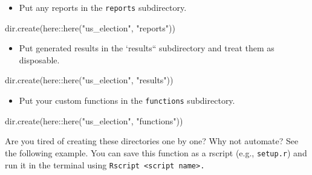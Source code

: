 \documentclass[
  letterpaper,
  DIV=11,
  numbers=noendperiod]{scrreprt}
\newenvironment{Shaded}{\begin{snugshade}}{\end{snugshade}}
\newcommand{\FunctionTok}[1]{\textcolor[rgb]{0.28,0.35,0.67}{#1}}
\newcommand{\NormalTok}[1]{\textcolor[rgb]{0.00,0.23,0.31}{#1}}
\newcommand{\SpecialCharTok}[1]{\textcolor[rgb]{0.37,0.37,0.37}{#1}}
\newcommand{\StringTok}[1]{\textcolor[rgb]{0.13,0.47,0.30}{#1}}
\providecommand{\tightlist}{%
  \setlength{\itemsep}{0pt}\setlength{\parskip}{0pt}}\usepackage{longtable,booktabs,array}
\begin{document}
\begin{itemize}
\tightlist
\item
  Put any reports in the \texttt{reports} subdirectory.
\end{itemize}

\begin{Shaded}
\begin{Highlighting}[]
\FunctionTok{dir.create}\NormalTok{(here}\SpecialCharTok{::}\FunctionTok{here}\NormalTok{(}\StringTok{"us\_election"}\NormalTok{, }\StringTok{"reports"}\NormalTok{))}
\end{Highlighting}
\end{Shaded}

\begin{itemize}
\tightlist
\item
  Put generated results in the `results`` subdirectory and treat them as
  disposable.
\end{itemize}

\begin{Shaded}
\begin{Highlighting}[]
\FunctionTok{dir.create}\NormalTok{(here}\SpecialCharTok{::}\FunctionTok{here}\NormalTok{(}\StringTok{"us\_election"}\NormalTok{, }\StringTok{"results"}\NormalTok{))}
\end{Highlighting}
\end{Shaded}

\begin{itemize}
\tightlist
\item
  Put your custom functions in the \texttt{functions} subdirectory.
\end{itemize}

\begin{Shaded}
\begin{Highlighting}[]
\FunctionTok{dir.create}\NormalTok{(here}\SpecialCharTok{::}\FunctionTok{here}\NormalTok{(}\StringTok{"us\_election"}\NormalTok{, }\StringTok{"functions"}\NormalTok{))}
\end{Highlighting}
\end{Shaded}

Are you tired of creating these directories one by one? Why not
automate? See the following example. You can save this function as a
rscript (e.g., \texttt{setup.r}) and run it in the terminal using
\texttt{Rscript\ \textless{}script\ name\textgreater{}.}
\end{document}
